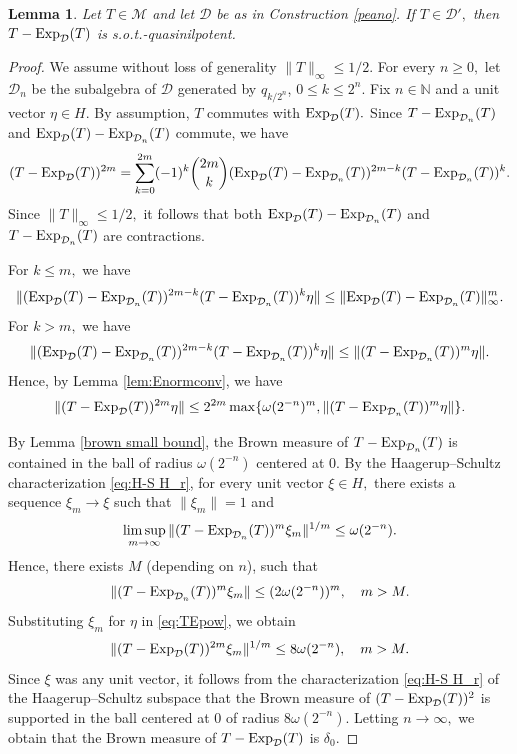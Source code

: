\documentclass{amsart}
\theoremstyle{plain}
\newtheorem{lem}[thm]{Lemma}
\theoremstyle{remark}
\begin{document}
\begin{lem}\label{comm quasinilpotent}
Let $T\in\mathcal{M}$ and let $\mathcal{D}$ be as in Construction \ref{peano}.
If $T\in\mathcal{D}',$ then $T-{\rm Exp}_{\mathcal{D}}(T)$ is s.o.t.-quasinilpotent.
\end{lem}
\begin{proof} We assume without loss of generality $\|T\|_{\infty}\leq 1/2$.
For every $n\geq0,$ let $\mathcal{D}_n$ be the subalgebra of $\mathcal{D}$ generated by $q_{k/2^n}$,
$0\leq k\leq 2^n$.
Fix $n\in\mathbb{N}$ and a unit vector $\eta\in H.$ By assumption, $T$ commutes with ${\rm Exp}_{\mathcal{D}}(T).$ Since $T-{\rm Exp}_{\mathcal{D}_n}(T)$ and ${\rm Exp}_{\mathcal{D}}(T)-{\rm Exp}_{\mathcal{D}_n}(T)$ commute, we have
$$(T-{\rm Exp}_{\mathcal{D}}(T))^{2m}=\sum_{k=0}^{2m}(-1)^k\binom{2m}{k}({\rm Exp}_{\mathcal{D}}(T)-{\rm Exp}_{\mathcal{D}_n}(T))^{2m-k}(T-{\rm Exp}_{\mathcal{D}_n}(T))^k.$$
Since $\|T\|_{\infty}\leq 1/2,$ it follows that both ${\rm Exp}_{\mathcal{D}}(T)-{\rm Exp}_{\mathcal{D}_n}(T)$ and $T-{\rm Exp}_{\mathcal{D}_n}(T)$ are contractions.

For $k\leq m,$ we have
$$\|({\rm Exp}_{\mathcal{D}}(T)-{\rm Exp}_{\mathcal{D}_n}(T))^{2m-k}(T-{\rm Exp}_{\mathcal{D}_n}(T))^k\eta\|\leq\|{\rm Exp}_{\mathcal{D}}(T)-{\rm Exp}_{\mathcal{D}_n}(T)\|_{\infty}^m.$$
For $k>m,$ we have
$$\|({\rm Exp}_{\mathcal{D}}(T)-{\rm Exp}_{\mathcal{D}_n}(T))^{2m-k}(T-{\rm Exp}_{\mathcal{D}_n}(T))^k\eta\|\leq\|(T-{\rm Exp}_{\mathcal{D}_n}(T))^m\eta\|.$$
Hence, by Lemma \ref{lem:Enormconv}, we have
\begin{equation}\label{eq:TEpow}
\|(T-{\rm Exp}_{\mathcal{D}}(T))^{2m}\eta\|\leq 2^{2m}\max\{\omega(2^{-n})^m,\|(T-{\rm Exp}_{\mathcal{D}_n}(T))^m\eta\|\}.
\end{equation}

By Lemma \ref{brown small bound}, the Brown measure of $T-{\rm Exp}_{\mathcal{D}_n}(T)$ is contained in the ball of radius $\omega(2^{-n})$ centered at $0.$ By the Haagerup--Schultz characterization \eqref{eq:H-S H_r}, for every unit vector $\xi\in H,$ there exists a sequence $\xi_m\to\xi$ such that $\|\xi_m\|=1$ and
$$\limsup_{m\to\infty}\|(T-{\rm Exp}_{\mathcal{D}_n}(T))^m\xi_m\|^{1/m}\leq\omega(2^{-n}).$$
Hence, there exists $M$ (depending on $n$), such that
$$\|(T-{\rm Exp}_{\mathcal{D}_n}(T))^m\xi_m\|\leq (2\omega(2^{-n}))^m,\quad m>M.$$
Substituting $\xi_m$ for $\eta$ in \eqref{eq:TEpow}, we obtain
$$\|(T-{\rm Exp}_{\mathcal{D}}(T))^{2m}\xi_m\|^{1/m}\leq 8\omega(2^{-n}),\quad m>M.$$
Since $\xi$ was any unit vector, it follows from the characterization \eqref{eq:H-S H_r} of the Haagerup--Schultz subspace that the Brown measure of $(T-{\rm Exp}_{\mathcal{D}}(T))^2$ is supported in the ball centered at $0$ of radius $8\omega(2^{-n}).$ Letting $n\to\infty,$ we obtain that the Brown measure of $T-{\rm Exp}_{\mathcal{D}}(T)$ is $\delta_0.$
\end{proof}
\end{document}
